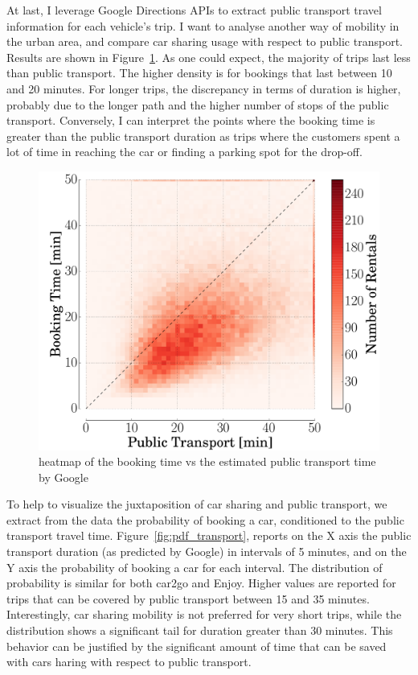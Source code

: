 At last, I leverage Google Directions APIs to extract public transport travel information for each vehicle's trip. I want to analyse another way of mobility in the urban area, and compare car sharing usage with respect to public transport. Results are shown in Figure~\ref{fig:3_5_public_transport}.
As one could expect, the majority of trips last less than public transport. The higher density is for bookings that last between 10 and 20 minutes. For longer trips, the discrepancy in terms of duration is higher, probably due to the longer path and the higher number of stops of the public transport. Conversely, I can interpret the points where the booking time is greater than  the public transport duration as trips where the customers spent a lot of time in reaching the car or finding a parking spot for the drop-off.

\begin{figure}[h!]
	\centering
	\includegraphics[width=0.85\columnwidth]{figures/car2go_faster_public.pdf}
	\caption{heatmap of the booking time  vs the estimated public transport time by Google\label{fig:3_5_public_transport}}
\end{figure}

To help to visualize the juxtaposition of car sharing and public transport, we extract from the data the probability of booking a car, conditioned to the public transport travel time. Figure~\ref{fig:pdf_transport}, reports on the X axis the public transport duration (as predicted by Google) in intervals of 5 minutes, and on the Y axis the probability of booking a car for each interval.
The distribution of probability is similar for both car2go and Enjoy. Higher values are reported for trips that can be covered by public transport between 15 and 35 minutes. Interestingly, car sharing mobility is not preferred for very short trips, while the distribution shows a significant tail for duration greater than 30 minutes. This behavior can be justified by the significant amount of time that can be saved with cars haring with respect to public transport.

